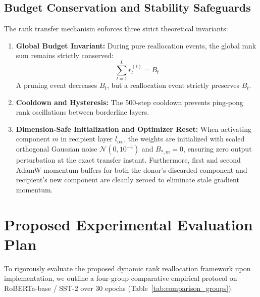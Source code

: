 \documentclass[conference]{IEEEtran}
\begin{document}
\subsection{Budget Conservation and Stability Safeguards}
The rank transfer mechanism enforces three strict theoretical invariants:
\begin{enumerate}
  \item \textbf{Global Budget Invariant:} During pure reallocation events, the global rank sum remains strictly conserved:
  \begin{equation}
    \sum_{l=1}^L r_l^{(t)} = B_t
    \label{eq:invariant}
  \end{equation}
  A pruning event decreases $B_t$, but a reallocation event strictly preserves $B_t$.
  \item \textbf{Cooldown and Hysteresis:} The 500-step cooldown prevents ping-pong rank oscillations between borderline layers.
  \item \textbf{Dimension-Safe Initialization and Optimizer Reset:} When activating component $m$ in recipient layer $l_{\text{rec}}$, the weights are initialized with scaled orthogonal Gaussian noise $\mathcal{N}(0, 10^{-4})$ and $B_{*,m} = 0$, ensuring zero output perturbation at the exact transfer instant. Furthermore, first and second AdamW momentum buffers for both the donor's discarded component and recipient's new component are cleanly zeroed to eliminate stale gradient momentum.
\end{enumerate}

\section{Proposed Experimental Evaluation Plan}
\label{sec:proposed_eval}

To rigorously evaluate the proposed dynamic rank reallocation framework upon implementation, we outline a four-group comparative empirical protocol on RoBERTa-base / SST-2 over 30 epochs (Table~\ref{tab:comparison_groups}).

\begin{table}[t]
  \centering
  \caption{Proposed experimental comparison groups}
  \label{tab:comparison_groups}
\end{table}
\end{document}
